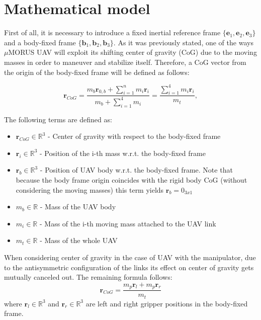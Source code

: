 \section{Mathematical model}
First of all, it is necessary to introduce a fixed inertial reference frame $\{  \textbf{e}_1,  \textbf{e}_2,  \textbf{e}_3  \}$ and a body-fixed frame $ \{  \textbf{b}_1,  \textbf{b}_2,  \textbf{b}_3 \}$. As it was previously stated, one of the ways $\mu$MORUS UAV will exploit its shifting center of gravity (CoG) due to the moving masses in order to maneuver and stabilize itself. Therefore, a CoG vector from the origin of the body-fixed frame will be defined as follows:

\begin{equation}
	\textbf{r}_{CoG} = \frac{m_{b}\textbf{r}_{0,b} + \sum_{i=1}^n m_{i} \textbf{r}_{i}}{m_{b} + \sum_{i=1}^4 m_{i}} = \frac{\sum_{i=1}^4 m_{i}\textbf{r}_{i}}{m_t},
	\label{equ:cog}
\end{equation}

The following terms are defined as: 
\begin{itemize}
	\item $ \textbf{r}_{CoG} \in \mathbb{\text{R}}^3$ - Center of gravity with respect to the body-fixed frame
	
	\item $ \textbf{r}_{i} \in \mathbb{\text{R}}^3$ - Position of the i-th mass w.r.t. the body-fixed frame
	
	\item $ \textbf{r}_{b} \in \mathbb{\text{R}}^3$ - Position of UAV body w.r.t. the body-fixed frame. Note that because the body frame origin coincides with the rigid body CoG (without considering the moving masses) this term yields $ \textbf{r}_b = 0_{3x1}$
	
	\item $m_b \in \mathbb{R}$ - Mass of the UAV body 
	
	\item $m_i \in \mathbb{R}$ - Mass of the i-th moving mass attached to the UAV link
	
	\item $m_t \in \mathbb{R}$ - Mass of the whole UAV
\end{itemize}

When considering center of gravity in the case of UAV with the manipulator, due to the antisymmetric configuration of the links its effect on center of gravity gets mutually canceled out. The remaining formula follows:
\begin{equation}
	\textbf{r}_{CoG} = \frac{m_p\textbf{r}_l + m_p\textbf{r}_r}{m_t}
\end{equation}
where $\textbf{r}_l \in \mathbb{R}^3$ and $\textbf{r}_r \in \mathbb{R}^3$ are left and right gripper positions in the body-fixed frame. 

